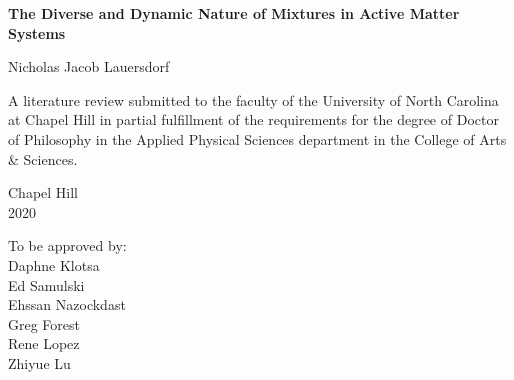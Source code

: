 \documentclass[11pt]{article}
\begin{document}
\begin{titlepage}
\begin{center}


\vspace{2in}
\Large \bf
The Diverse and Dynamic Nature of Mixtures in Active Matter Systems


\vspace{61pt} %
\large Nicholas Jacob Lauersdorf
\end{center}



\vspace{50pt}
\noindent \large
A literature review submitted to the faculty of the University of North Carolina at Chapel Hill
in partial fulfillment of the requirements for the degree of Doctor of Philosophy in
the Applied Physical Sciences department in the College of Arts \& Sciences.


\vspace{50pt}
\begin{center}
\large
Chapel Hill\\
2020
\end{center}


\vfill
\begin{flushright}
\begin{minipage}[t]{1.5in} \large
To be approved by: \\
Daphne Klotsa \\
Ed Samulski \\
Ehssan Nazockdast \\
Greg Forest \\
Rene Lopez \\
Zhiyue Lu
\end{minipage}
\end{flushright}

\end{titlepage}
\end{document}
